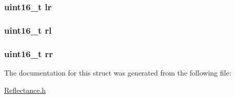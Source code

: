 \subsubsection[{\texorpdfstring{lr}{lr}}]{\setlength{\rightskip}{0pt plus 5cm}uint16\+\_\+t lr}\hypertarget{structdigital__sensor__value___af650f74b54fbe6d55c96161d2a7098ea}{}\label{structdigital__sensor__value___af650f74b54fbe6d55c96161d2a7098ea}
\subsubsection[{\texorpdfstring{rl}{rl}}]{\setlength{\rightskip}{0pt plus 5cm}uint16\+\_\+t rl}\hypertarget{structdigital__sensor__value___a55f8b53aee5b41e8af88a816fab2b70b}{}\label{structdigital__sensor__value___a55f8b53aee5b41e8af88a816fab2b70b}
\subsubsection[{\texorpdfstring{rr}{rr}}]{\setlength{\rightskip}{0pt plus 5cm}uint16\+\_\+t rr}\hypertarget{structdigital__sensor__value___a6988d1a89f109b3f8d0e06547a5362f6}{}\label{structdigital__sensor__value___a6988d1a89f109b3f8d0e06547a5362f6}


The documentation for this struct was generated from the following file\+:\begin{DoxyCompactItemize}
\item 
\hyperlink{_reflectance_8h}{Reflectance.\+h}\end{DoxyCompactItemize}
